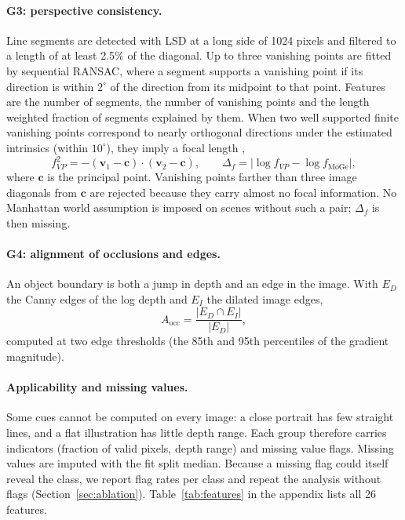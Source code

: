 \documentclass[11pt,a4paper]{article}
\begin{document}
\paragraph{G3: perspective consistency.} Line segments are detected with LSD \citep{vongioi2012lsd} at a long side of 1024 pixels and filtered to a length of at least 2.5\% of the diagonal. Up to three vanishing points are fitted by sequential RANSAC, where a segment supports a vanishing point if its direction is within $2^\circ$ of the direction from its midpoint to that point. Features are the number of segments, the number of vanishing points and the length weighted fraction of segments explained by them. When two well supported finite vanishing points correspond to nearly orthogonal directions under the estimated intrinsics (within $10^\circ$), they imply a focal length \citep{hartley2004multiple},
\begin{equation}
f_{VP}^2 = -(\mathbf{v}_1 - \mathbf{c}) \cdot (\mathbf{v}_2 - \mathbf{c}), \qquad \Delta_f = \big|\log f_{VP} - \log f_{\mathrm{MoGe}}\big| ,
\label{eq:focal}
\end{equation}
where $\mathbf{c}$ is the principal point. Vanishing points farther than three image diagonals from $\mathbf{c}$ are rejected because they carry almost no focal information. No Manhattan world assumption is imposed on scenes without such a pair; $\Delta_f$ is then missing.

\paragraph{G4: alignment of occlusions and edges.} An object boundary is both a jump in depth and an edge in the image. With $E_D$ the Canny edges of the log depth and $E_I$ the dilated image edges,
\begin{equation}
A_{\mathrm{occ}} = \frac{|E_D \cap E_I|}{|E_D|},
\label{eq:aocc}
\end{equation}
computed at two edge thresholds (the 85th and 95th percentiles of the gradient magnitude).

\paragraph{Applicability and missing values.} Some cues cannot be computed on every image: a close portrait has few straight lines, and a flat illustration has little depth range. Each group therefore carries indicators (fraction of valid pixels, depth range) and missing value flags. Missing values are imputed with the fit split median. Because a missing flag could itself reveal the class, we report flag rates per class and repeat the analysis without flags (Section~\ref{sec:ablation}). Table~\ref{tab:features} in the appendix lists all 26 features.
\end{document}
